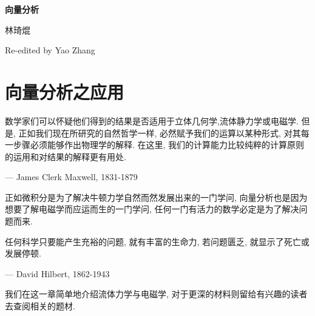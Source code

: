 \documentclass[11pt]{article}
\begin{document}
	\kaishu 
	
	\thispagestyle{empty}
	
	\setcounter{section}{4}
	
	\begin{center}
		{\LARGE \bf   \kaishu 向量分析 }
		
		\vspace{-0.25cm}
		
		{ \large \kaishu 林琦焜 }
		
		\vspace{-0.35cm}
		
		{ \small Re-edited by Yao Zhang}
	\end{center}











\section{\kaishu 向量分析之应用}

{\color{cyan} 数学家们可以怀疑他们得到的结果是否适用于立体几何学,流体静力学或电磁学. 但是, 正如我们现在所研究的自然哲学一样, 必然赋予我们的运算以某种形式, 对其每一步骤必须能够作出物理学的解释. 在这里, 我们的计算能力比较纯粹的计算原则的运用和对结果的解释更有用处. 
	
--- James Clerk Maxwell, 1831-1879}

正如微积分是为了解决牛顿力学自然而然发展出来的一门学问, 向量分析也是因为想要了解电磁学而应运而生的一门学问, 任何一门有活力的数学必定是为了解决问题而来.

{\color{cyan} 任何科学只要能产生充裕的问题, 就有丰富的生命力, 若问题匮乏, 就显示了死亡或发展停顿. 
	
 --- David Hilbert, 1862-1943}

我们在这一章简单地介绍流体力学与电磁学, 对于更深的材料则留给有兴趣的读者去查阅相关的题材. 
\end{document}
